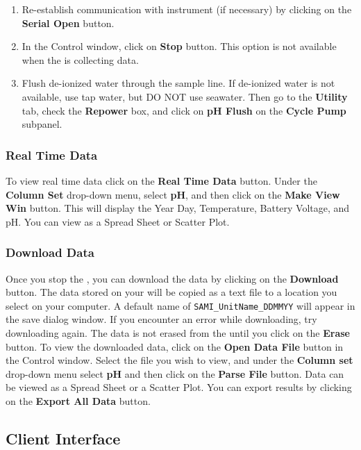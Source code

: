 \or			%

\begin{enumerate}
\item Re-establish communication with instrument (if necessary) by clicking on the \textbf{Serial Open} button.
\item In the Control window, click on \textbf{Stop} button.  This option is not available when the \instType{} is collecting data.
\item {\color{red} Flush de-ionized water through the sample line.  If de-ionized water is not available, use tap water, but DO NOT use seawater.  Then go to the \textbf{Utility} tab, check the \textbf{Repower} box, and click on \textbf{pH Flush} on the \textbf{Cycle Pump} subpanel.}
\end{enumerate}

\fi


\subsubsection{Real Time Data}

To view real time data click on the \textbf{Real Time Data} button. Under the \textbf{Column Set} drop-down menu, select \textbf{pH}, and then click on the \textbf{Make View Win} button. This will display the Year Day, Temperature, Battery Voltage, and pH. You can view as a Spread Sheet or Scatter Plot. 

\subsubsection{Download Data}

Once you stop the \instType{}, you can download the data by clicking on the \textbf{Download} button. The data stored on your \instType{} will be copied as a text file to a location you select on your computer. A default name of \verb|SAMI_UnitName_DDMMYY| will appear in the save dialog window. If you encounter an error while downloading, try downloading again. The data is not erased from the \instType{} until you click on the \textbf{Erase} button. To view the downloaded data, click on the \textbf{Open Data File} button in the Control window. Select the file you wish to view, and under the \textbf{Column set} drop-down menu select \textbf{pH} and then click on the \textbf{Parse File} button. Data can be viewed as a Spread Sheet or a Scatter Plot. You can export results by clicking on the \textbf{Export All Data} button.


\subsection{\instType{} Client Interface}

